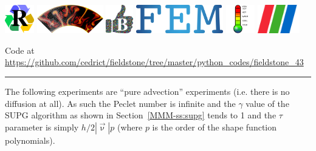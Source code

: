 \noindent
\includegraphics[height=1.25cm]{images/pictograms/replication}
\includegraphics[height=1.25cm]{images/pictograms/aspect_logo}
\includegraphics[height=1.25cm]{images/pictograms/benchmark}
\includegraphics[height=1.25cm]{images/pictograms/FEM}
\includegraphics[height=1.25cm]{images/pictograms/temperature}
\includegraphics[height=1.25cm]{images/pictograms/paraview}


%

\begin{center}
Code at \url{https://github.com/cedrict/fieldstone/tree/master/python_codes/fieldstone_43}
\end{center}

\par\noindent\rule{\textwidth}{0.4pt}

The following experiments are ``pure advection'' experiments (i.e. there is 
no diffusion at all). As such the Peclet number
is infinite and the $\gamma$ value of the SUPG algorithm as shown in Section~\ref{MMM-ss:supg} tends to 1
and the $\tau$ parameter is simply $h/2 |\vec\upnu| p$ (where $p$ is the order of 
the shape function polynomials).

